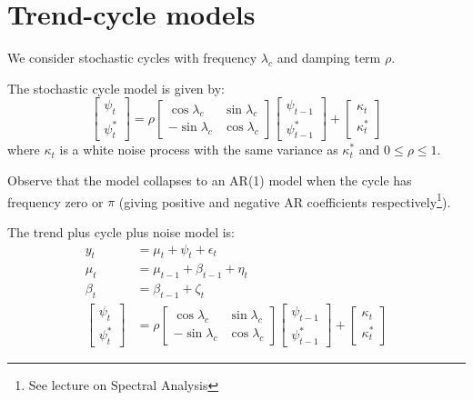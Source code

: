 \documentclass[DIV=14,titlepage=false]{scrreprt}
\begin{document}
\section{Trend-cycle models}
We consider stochastic cycles with frequency $\lambda_c$ and damping term $\rho$. 
\begin{definition}
The stochastic cycle model is given by:
\begin{equation} 
\label{eq:stochseasonal}   
  \begin{bmatrix}
    \psi_t\\
    \psi_{t}^*
  \end{bmatrix}  = \rho \begin{bmatrix}
    \cos \lambda_c & \sin \lambda_c\\
    -\sin \lambda_c & \cos \lambda_c
    \end{bmatrix} \begin{bmatrix}
    \psi_{t-1}\\
    \psi_{t-1}^*
    \end{bmatrix} + \begin{bmatrix}
    \kappa_t\\
    \kappa_t^*
    \end{bmatrix}
\end{equation}
where $\kappa_t$ is a white noise process with the same variance as $\kappa_t^*$ and $0\leq \rho \leq 1$.
\end{definition}
Observe that the model collapses to an AR(1) model when the cycle has frequency zero or $\pi$ (giving positive and negative AR coefficients respectively\footnote{See lecture on Spectral Analysis}).
\begin{definition}
    The trend plus cycle plus noise model is:
    \begin{align*}
        y_t &= \mu_t + \psi_t + \epsilon_t\\
        \mu_t &= \mu_{t-1} + \beta_{t-1} + \eta_t\\
        \beta_t &= \beta_{t-1} + \zeta_t\\
        \begin{bmatrix}
            \psi_t\\
            \psi_{t}^*
          \end{bmatrix}  &= \rho \begin{bmatrix}
            \cos \lambda_c & \sin \lambda_c\\
            -\sin \lambda_c & \cos \lambda_c
            \end{bmatrix} \begin{bmatrix}
            \psi_{t-1}\\
            \psi_{t-1}^*
            \end{bmatrix} + \begin{bmatrix}
            \kappa_t\\
            \kappa_t^*
            \end{bmatrix}
    \end{align*}
\end{definition}
\end{document}
